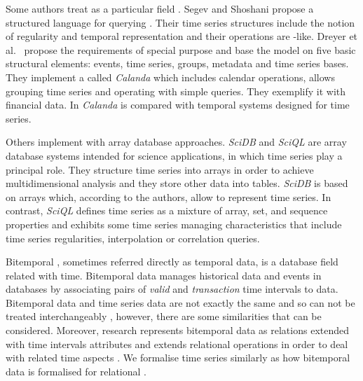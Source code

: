 Some authors treat  as a particular  field
\cite{last01}.  Segev and Shoshani \cite{segev87:sigmod} propose a
structured language for querying . Their time series
structures include the notion of regularity and temporal
representation and their operations are -like.  Dreyer et
al.\ \cite{dreyer94} propose the requirements of special purpose
 and base the model on five basic structural elements:
events, time series, groups, metadata and time series bases. They
implement a  called \emph{Calanda} which includes calendar
operations, allows grouping time series and operating with simple
queries. They exemplify it with financial data. In \cite{schmidt95}
\emph{Calanda} is compared with temporal systems designed for time
series.



 
Others implement  with array database approaches.
\emph{SciDB} \cite{stonebraker09:scidb} and \emph{SciQL}
\cite{zhang11} are array database systems intended for science
applications, in which time series play a principal role. They
structure time series into arrays in order to achieve multidimensional
analysis and they store other data into tables.  \emph{SciDB} is based
on arrays which, according to the authors, allow to represent time
series.  In contrast, \emph{SciQL} defines time series as a mixture of
array, set, and sequence properties and exhibits some time series
managing characteristics that include time series regularities,
interpolation or correlation queries.





Bitemporal , sometimes referred directly as temporal data,
is a database field related with time. Bitemporal data manages
historical data and events in databases by associating pairs of
\emph{valid} and \emph{transaction} time intervals to data.
Bitemporal data and time series data are not exactly the same and so
can not be treated interchangeably \cite{schmidt95}, however, there
are some similarities that can be considered. Moreover, 
research represents bitemporal data as relations extended with time
intervals attributes and extends relational operations in order to
deal with related time aspects
\cite{jensen99:temporaldata,date02:_tempor_data_relat_model}.  We
formalise time series similarly as how bitemporal data is formalised
for relational .



